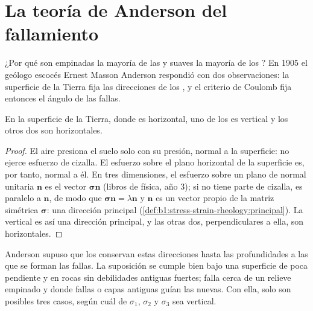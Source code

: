 \section{La teoría de Anderson del fallamiento}\label{sec:b1:faults-folds-fabrics:anderson}

¿Por qué son empinadas la mayoría de las  y suaves la mayoría de los ? En 1905 el geólogo
escocés Ernest Masson Anderson respondió con dos observaciones: la superficie de la Tierra fija las direcciones de los
, y el criterio de Coulomb fija entonces el ángulo de las fallas.

\begin{proposition}\label{prop:b1:faults-folds-fabrics:free-surface}
En la superficie de la Tierra, donde es horizontal, uno de los  es vertical y los otros dos son
horizontales.
\end{proposition}

\begin{proof}
El aire presiona el suelo solo con su presión, normal a la superficie: no ejerce esfuerzo de cizalla. El esfuerzo sobre el plano
horizontal de la superficie es, por tanto, normal a él. En tres dimensiones, el esfuerzo sobre un plano de normal unitaria
$\mathbf n$ es el vector $\boldsymbol\sigma\mathbf n$ (libros de física, año 3); si no tiene parte de cizalla, es paralelo a
$\mathbf n$, de modo que $\boldsymbol\sigma\mathbf n = \lambda\mathbf n$ y $\mathbf n$ es un vector propio de la matriz
simétrica $\boldsymbol\sigma$: una dirección principal (\cref{def:b1:stress-strain-rheology:principal}). La vertical es así
una dirección principal, y las otras dos, perpendiculares a ella, son horizontales.
\end{proof}

Anderson supuso que los  conservan estas direcciones hasta las profundidades a las que se forman las
fallas. La suposición se cumple bien bajo una superficie de poca pendiente y en rocas sin debilidades antiguas fuertes; falla
cerca de un relieve empinado y donde fallas o capas antiguas guían las nuevas. Con ella, solo son posibles tres casos, según
cuál de $\sigma_1$, $\sigma_2$ y $\sigma_3$ sea vertical.


